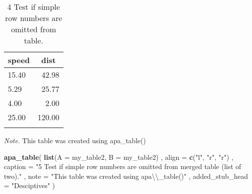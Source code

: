 \documentclass[english,man]{apa6}
\newenvironment{Shaded}{\begin{snugshade}}{\end{snugshade}}
\newcommand{\KeywordTok}[1]{\textcolor[rgb]{0.13,0.29,0.53}{\textbf{#1}}}
\newcommand{\DataTypeTok}[1]{\textcolor[rgb]{0.13,0.29,0.53}{#1}}
\newcommand{\CharTok}[1]{\textcolor[rgb]{0.31,0.60,0.02}{#1}}
\newcommand{\StringTok}[1]{\textcolor[rgb]{0.31,0.60,0.02}{#1}}
\newcommand{\NormalTok}[1]{#1}
\theoremstyle{definition}
\theoremstyle{definition}
\theoremstyle{definition}
\theoremstyle{remark}
\begin{document}
\begin{table}[tbp]
\begin{center}
\begin{threeparttable}
\caption{\label{tab:unnamed-chunk-4}4 Test if simple row numbers are omitted from table.}
\begin{tabular}{lr}
\toprule
speed & \multicolumn{1}{c}{dist}\\
\midrule
15.40 & 42.98\\
5.29 & 25.77\\
4.00 & 2.00\\
25.00 & 120.00\\
\bottomrule
\addlinespace
\end{tabular}
\begin{tablenotes}[para]
\textit{Note.} This table was created using apa\_table()
\end{tablenotes}
\end{threeparttable}
\end{center}
\end{table}

\begin{Shaded}
\begin{Highlighting}[]
\KeywordTok{apa_table}\NormalTok{(}
  \KeywordTok{list}\NormalTok{(}\DataTypeTok{A =}\NormalTok{ my_table2, }\DataTypeTok{B =}\NormalTok{ my_table2)}
\NormalTok{  , }\DataTypeTok{align =} \KeywordTok{c}\NormalTok{(}\StringTok{"l"}\NormalTok{, }\StringTok{"r"}\NormalTok{, }\StringTok{"r"}\NormalTok{)}
\NormalTok{  , }\DataTypeTok{caption =} \StringTok{"5 Test if simple row numbers are omitted from merged table (list of two)."}
\NormalTok{  , }\DataTypeTok{note =} \StringTok{"This table was created using apa}\CharTok{\textbackslash{}\textbackslash{}}\StringTok{_table()"}
\NormalTok{  , }\DataTypeTok{added_stub_head =} \StringTok{"Desciptives"}
\NormalTok{)}
\end{Highlighting}
\end{Shaded}
\end{document}
